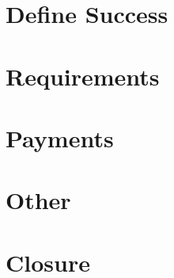 \documentclass{article}
\begin{document}
  \section{Define Success}

  \section{Requirements}
  \section{Payments}
  \section{Other}
  \section{Closure}
\end{document}
